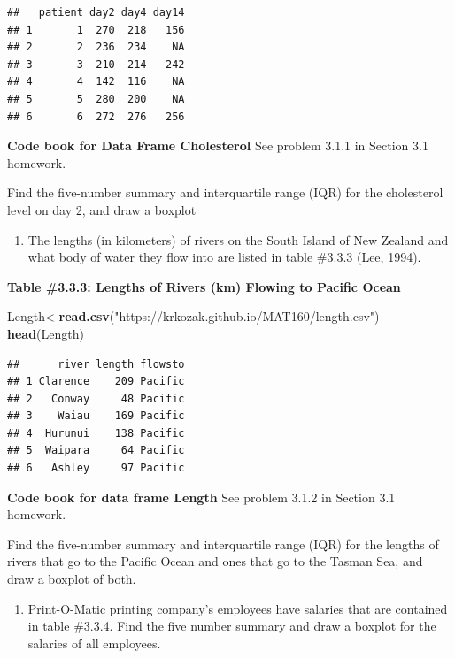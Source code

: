 \documentclass[
]{book}
\newenvironment{Shaded}{\begin{snugshade}}{\end{snugshade}}
\newcommand{\KeywordTok}[1]{\textcolor[rgb]{0.13,0.29,0.53}{\textbf{#1}}}
\newcommand{\NormalTok}[1]{#1}
\newcommand{\StringTok}[1]{\textcolor[rgb]{0.31,0.60,0.02}{#1}}
\providecommand{\tightlist}{%
  \setlength{\itemsep}{0pt}\setlength{\parskip}{0pt}}
\begin{document}
\begin{verbatim}
##   patient day2 day4 day14
## 1       1  270  218   156
## 2       2  236  234    NA
## 3       3  210  214   242
## 4       4  142  116    NA
## 5       5  280  200    NA
## 6       6  272  276   256
\end{verbatim}

\textbf{Code book for Data Frame Cholesterol} See problem 3.1.1 in Section 3.1 homework.

Find the five-number summary and interquartile range (IQR) for the cholesterol level on day 2, and draw a boxplot

\begin{enumerate}
\def\labelenumi{\arabic{enumi}.}
\setcounter{enumi}{5}
\tightlist
\item
  The lengths (in kilometers) of rivers on the South Island of New Zealand and what body of water they flow into are listed in table \#3.3.3 (Lee, 1994).
\end{enumerate}

\textbf{Table \#3.3.3: Lengths of Rivers (km) Flowing to Pacific Ocean}

\begin{Shaded}
\begin{Highlighting}[]
\NormalTok{Length<-}\KeywordTok{read.csv}\NormalTok{(}\StringTok{"https://krkozak.github.io/MAT160/length.csv"}\NormalTok{)}
\KeywordTok{head}\NormalTok{(Length)}
\end{Highlighting}
\end{Shaded}

\begin{verbatim}
##      river length flowsto
## 1 Clarence    209 Pacific
## 2   Conway     48 Pacific
## 3    Waiau    169 Pacific
## 4  Hurunui    138 Pacific
## 5  Waipara     64 Pacific
## 6   Ashley     97 Pacific
\end{verbatim}

\textbf{Code book for data frame Length} See problem 3.1.2 in Section 3.1 homework.

Find the five-number summary and interquartile range (IQR) for the lengths of rivers that go to the Pacific Ocean and ones that go to the Tasman Sea, and draw a boxplot of both.

\begin{enumerate}
\def\labelenumi{\arabic{enumi}.}
\setcounter{enumi}{6}
\tightlist
\item
  Print-O-Matic printing company's employees have salaries that are contained in table \#3.3.4. Find the five number summary and draw a boxplot for the salaries of all employees.
\end{enumerate}
\end{document}
